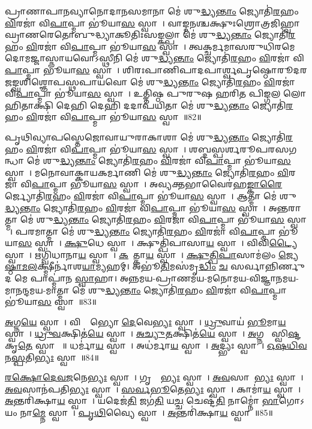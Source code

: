 𑌪𑍍𑌰𑌾𑌣𑌾𑌪𑌾𑌨𑌵𑍍𑌯𑌾𑌨𑍋𑌦𑌾𑌨𑌸𑌮𑌾𑌨𑌾 𑌮𑍇॑ 𑌶𑍁\ul{𑌦𑍍𑌧𑍍𑌯}\ul{𑌨𑍍𑌤𑌾𑌂} 𑌜𑍍𑌯𑍋𑌤𑌿॑\ul{𑌰}𑌹𑌂 \ul{𑌵𑌿}𑌰𑌜𑌾॑ 𑌵𑌿\ul{𑌪𑌾}𑌪𑍍𑌮𑌾 𑌭𑍂॑𑌯𑌾\ul{𑌸}\ul{} 𑌸𑍍𑌵𑌾𑌹𑌾᳚।
𑌵𑌾𑌙𑍍𑌮𑌨𑌶𑍍𑌚𑌕𑍍𑌷𑍁𑌃𑌶𑍍𑌰𑍋𑌤𑍍𑌰𑌜𑌿𑌹𑍍𑌵𑌾𑌘𑍍𑌰𑌾𑌣𑌰𑍇𑌤𑍋\-𑌬𑍁𑌦𑍍𑌧𑍍𑌯𑌾𑌕𑍂𑌤𑌿𑌃\-𑌸𑌙𑍍𑌕𑌲𑍍𑌪𑌾 𑌮𑍇॑ 𑌶𑍁\ul{𑌦𑍍𑌧𑍍𑌯}\ul{𑌨𑍍𑌤𑌾𑌂} 𑌜𑍍𑌯𑍋𑌤𑌿॑\ul{𑌰}𑌹𑌂 \ul{𑌵𑌿}𑌰𑌜𑌾॑ 𑌵𑌿\ul{𑌪𑌾}𑌪𑍍𑌮𑌾 𑌭𑍂॑𑌯𑌾\ul{𑌸}\ul{} 𑌸𑍍𑌵𑌾𑌹𑌾᳚। 
𑌤𑍍𑌵𑌕𑍍𑌚𑌰𑍍𑌮𑌮𑌾𑌸𑌰𑍁𑌧𑌿𑌰𑌮𑍇𑌦𑍋𑌮𑌜𑍍𑌜𑌾𑌸𑍍𑌨𑌾𑌯𑌵𑍋\-𑌽𑌸𑍍𑌥𑍀𑌨𑌿  𑌮𑍇॑ 𑌶𑍁\ul{𑌦𑍍𑌧𑍍𑌯}\ul{𑌨𑍍𑌤𑌾𑌂} 𑌜𑍍𑌯𑍋𑌤𑌿॑\ul{𑌰}𑌹𑌂 \ul{𑌵𑌿}𑌰𑌜𑌾॑ 𑌵𑌿\ul{𑌪𑌾}𑌪𑍍𑌮𑌾 𑌭𑍂॑𑌯𑌾\ul{𑌸}\ul{} 𑌸𑍍𑌵𑌾𑌹𑌾᳚। 
𑌶𑌿𑌰𑌃𑌪𑌾𑌣𑌿𑌪𑌾𑌦𑌪𑌾𑌰𑍍𑌶𑍍𑌵𑌪𑍃𑌷𑍍𑌠𑍋𑌰𑍂𑌦𑌰𑌜𑌙𑍍𑌘𑌶𑌿𑌶𑍍𑌞𑍋𑌪𑌸𑍍𑌥𑌪𑌾𑌯𑌵𑍋  𑌮𑍇॑ 𑌶𑍁\ul{𑌦𑍍𑌧𑍍𑌯}\ul{𑌨𑍍𑌤𑌾𑌂} 𑌜𑍍𑌯𑍋𑌤𑌿॑\ul{𑌰}𑌹𑌂 \ul{𑌵𑌿}𑌰𑌜𑌾॑ 𑌵𑌿\ul{𑌪𑌾}𑌪𑍍𑌮𑌾 𑌭𑍂॑𑌯𑌾\ul{𑌸}\ul{} 𑌸𑍍𑌵𑌾𑌹𑌾᳚।
𑌉𑌤𑍍𑌤𑌿𑌷𑍍𑌠 𑌪𑍁𑌰𑍁𑌷 𑌹𑌰𑌿𑌤 𑌪𑌿𑌙𑍍𑌗𑌲 𑌲𑍋𑌹𑌿𑌤𑌾𑌕𑍍𑌷𑌿 𑌦𑍇𑌹𑌿 𑌦𑍇𑌹𑌿 𑌦𑌦𑌾𑌪𑌯𑌿𑌤𑌾 𑌮𑍇॑ 𑌶𑍁\ul{𑌦𑍍𑌧𑍍𑌯}\ul{𑌨𑍍𑌤𑌾𑌂} 𑌜𑍍𑌯𑍋𑌤𑌿॑\ul{𑌰}𑌹𑌂 \ul{𑌵𑌿}𑌰𑌜𑌾॑ 𑌵𑌿\ul{𑌪𑌾}𑌪𑍍𑌮𑌾 𑌭𑍂॑𑌯𑌾\ul{𑌸}\ul{} 𑌸𑍍𑌵𑌾𑌹𑌾᳚॥82॥ 
\anuvakamend

𑌪𑍃𑌥𑌿𑌵𑍍𑌯𑌾𑌪𑌸𑍍𑌤𑍇𑌜𑍋𑌵𑌾𑌯𑍁𑌰𑌾𑌕𑌾𑌶𑌾 𑌮𑍇॑ 𑌶𑍁\ul{𑌦𑍍𑌧𑍍𑌯}\ul{𑌨𑍍𑌤𑌾𑌂} 𑌜𑍍𑌯𑍋𑌤𑌿॑\ul{𑌰}𑌹𑌂 \ul{𑌵𑌿}𑌰𑌜𑌾॑ 𑌵𑌿\ul{𑌪𑌾}𑌪𑍍𑌮𑌾 𑌭𑍂॑𑌯𑌾\ul{𑌸}\ul{} 𑌸𑍍𑌵𑌾𑌹𑌾᳚। 
𑌶𑌬𑍍𑌦𑌸𑍍𑌪𑌰𑍍𑌶𑌰𑍂𑌪𑌰𑌸𑌗𑌨𑍍𑌧𑌾  𑌮𑍇॑ 𑌶𑍁\ul{𑌦𑍍𑌧𑍍𑌯}\ul{𑌨𑍍𑌤𑌾𑌂} 𑌜𑍍𑌯𑍋𑌤𑌿॑\ul{𑌰}𑌹𑌂 \ul{𑌵𑌿}𑌰𑌜𑌾॑ 𑌵𑌿\ul{𑌪𑌾}𑌪𑍍𑌮𑌾 𑌭𑍂॑𑌯𑌾\ul{𑌸}\ul{} 𑌸𑍍𑌵𑌾𑌹𑌾᳚। 
𑌮𑌨𑍋𑌵𑌾𑌕𑍍𑌕𑌾𑌯𑌕𑌰𑍍𑌮𑌾𑌣𑌿  𑌮𑍇॑ 𑌶𑍁\ul{𑌦𑍍𑌧𑍍𑌯}\ul{𑌨𑍍𑌤𑌾𑌂} 𑌜𑍍𑌯𑍋𑌤𑌿॑\ul{𑌰}𑌹𑌂 \ul{𑌵𑌿}𑌰𑌜𑌾॑ 𑌵𑌿\ul{𑌪𑌾}𑌪𑍍𑌮𑌾 𑌭𑍂॑𑌯𑌾\ul{𑌸}\ul{} 𑌸𑍍𑌵𑌾𑌹𑌾᳚। 
𑌅𑌵𑍍𑌯𑌕𑍍𑌤𑌭𑌾𑌵𑍈𑌰॑𑌹\ul{𑌙𑍍𑌕𑌾}\ul{𑌰𑍈}𑌰𑍍𑌜𑍍𑌯𑍋𑌤𑌿॑\ul{𑌰}𑌹𑌂 \ul{𑌵𑌿}𑌰𑌜𑌾॑ 𑌵𑌿\ul{𑌪𑌾}𑌪𑍍𑌮𑌾 𑌭𑍂॑𑌯𑌾\ul{𑌸}\ul{} 𑌸𑍍𑌵𑌾𑌹𑌾᳚। 
𑌆𑌤𑍍𑌮𑌾 𑌮𑍇॑ 𑌶𑍁\ul{𑌦𑍍𑌧𑍍𑌯}\ul{𑌨𑍍𑌤𑌾𑌂} 𑌜𑍍𑌯𑍋𑌤𑌿॑\ul{𑌰}𑌹𑌂 \ul{𑌵𑌿}𑌰𑌜𑌾॑ 𑌵𑌿\ul{𑌪𑌾}𑌪𑍍𑌮𑌾 𑌭𑍂॑𑌯𑌾\ul{𑌸}\ul{} 𑌸𑍍𑌵𑌾𑌹𑌾᳚। 
𑌅𑌨𑍍𑌤𑌰𑌾𑌤𑍍𑌮𑌾 𑌮𑍇॑ 𑌶𑍁\ul{𑌦𑍍𑌧𑍍𑌯}\ul{𑌨𑍍𑌤𑌾𑌂} 𑌜𑍍𑌯𑍋𑌤𑌿॑\ul{𑌰}𑌹𑌂 \ul{𑌵𑌿}𑌰𑌜𑌾॑ 𑌵𑌿\ul{𑌪𑌾}𑌪𑍍𑌮𑌾 𑌭𑍂॑𑌯𑌾\ul{𑌸}\ul{} 𑌸𑍍𑌵𑌾𑌹𑌾᳚। 
𑌪𑌰𑌮𑌾𑌤𑍍𑌮𑌾  𑌮𑍇॑ 𑌶𑍁\ul{𑌦𑍍𑌧𑍍𑌯}\ul{𑌨𑍍𑌤𑌾𑌂} 𑌜𑍍𑌯𑍋𑌤𑌿॑\ul{𑌰}𑌹𑌂 \ul{𑌵𑌿}𑌰𑌜𑌾॑ 𑌵𑌿\ul{𑌪𑌾}𑌪𑍍𑌮𑌾 𑌭𑍂॑𑌯𑌾\ul{𑌸}\ul{} 𑌸𑍍𑌵𑌾𑌹𑌾᳚। 
\ul{𑌕𑍍𑌷𑍁}𑌧𑍇 𑌸𑍍𑌵𑌾𑌹𑌾᳚। 
𑌕𑍍𑌷𑍁𑌤𑍍𑌪𑌿॑𑌪𑌾𑌸𑌾\ul{𑌯} 𑌸𑍍𑌵𑌾𑌹𑌾᳚। 
𑌵𑌿𑌵𑌿॑\ul{𑌟𑍍𑌯𑍈} 𑌸𑍍𑌵𑌾𑌹𑌾᳚। 
𑌋𑌗𑍍𑌵𑌿॑𑌧𑌾𑌨𑌾\ul{𑌯} 𑌸𑍍𑌵𑌾𑌹𑌾᳚। 
\ul{𑌕}𑌷𑍋᳚𑌤𑍍𑌕𑌾\ul{𑌯} 𑌸𑍍𑌵𑌾𑌹𑌾᳚। 
\ul{𑌕𑍍𑌷𑍁}\ul{𑌤𑍍𑌪𑌿}\ul{𑌪𑌾}𑌸𑌾𑌮॑𑌲𑌂 \ul{𑌜𑍍𑌯𑍇}\ul{𑌷𑍍𑌠𑌾}\ul{𑌮}\ul{𑌲}𑌕𑍍𑌷𑍍𑌮𑍀𑌰𑍍𑌨𑌾॑𑌶\ul{𑌯𑌾}𑌮𑍍𑌯𑌹𑌮𑍍। 
𑌅𑌭𑍂॑\ul{𑌤𑌿}𑌮𑌸॑𑌮𑍃\ul{𑌦𑍍𑌧𑌿𑌂} \ul{𑌚} 𑌸𑌰𑍍𑌵𑌾𑌨𑍍𑌨𑌿𑌰𑍍𑌣𑍁𑌦 𑌮𑍇 𑌪𑌾𑌪𑍍𑌮𑌾॑𑌨 \ul{𑌸𑍍𑌵𑌾}𑌹𑌾।
𑌅𑌨𑍍𑌨𑌮𑌯-𑌪𑍍𑌰𑌾𑌣𑌮𑌯-𑌮𑌨𑍋𑌮𑌯-𑌵𑌿𑌜𑍍𑌞𑌾𑌨𑌮𑌯-𑌮𑌾𑌨𑌨𑍍𑌦𑌮𑌯-𑌮𑌾𑌤𑍍𑌮𑌾 𑌮𑍇॑ 𑌶𑍁\ul{𑌦𑍍𑌧𑍍𑌯}\ul{𑌨𑍍𑌤𑌾𑌂} 𑌜𑍍𑌯𑍋𑌤𑌿॑\ul{𑌰}𑌹𑌂 \ul{𑌵𑌿}𑌰𑌜𑌾॑ 𑌵𑌿\ul{𑌪𑌾}𑌪𑍍𑌮𑌾 𑌭𑍂॑𑌯𑌾\ul{𑌸}\ul{} 𑌸𑍍𑌵𑌾𑌹𑌾᳚॥83॥
\anuvakamend

\ul{𑌅}𑌗𑍍𑌨\ul{𑌯𑍇} 𑌸𑍍𑌵𑌾𑌹𑌾᳚। 
𑌵𑌿𑌶𑍍𑌵𑍇᳚𑌭𑍍𑌯𑍋 \ul{𑌦𑍇}𑌵𑍇\ul{𑌭𑍍𑌯𑌃} 𑌸𑍍𑌵𑌾𑌹𑌾᳚। 
\ul{𑌧𑍍𑌰𑍁}𑌵𑌾𑌯॑ \ul{𑌭𑍂}𑌮𑌾\ul{𑌯} 𑌸𑍍𑌵𑌾𑌹𑌾᳚। 
\ul{𑌧𑍍𑌰𑍁}\ul{𑌵}𑌕𑍍𑌷𑌿𑌤॑\ul{𑌯𑍇} 𑌸𑍍𑌵𑌾𑌹𑌾᳚। 
\ul{𑌅}\ul{𑌚𑍍𑌯𑍁}\ul{𑌤}𑌕𑍍𑌷𑌿𑌤॑\ul{𑌯𑍇} 𑌸𑍍𑌵𑌾𑌹𑌾᳚। 
\ul{𑌅}𑌗𑍍𑌨𑌯𑍇᳚ 𑌸𑍍𑌵𑌿\ul{𑌷𑍍𑌟}𑌕𑍃\ul{𑌤𑍇} 𑌸𑍍𑌵𑌾𑌹𑌾᳚ ॥ 
𑌧𑌰𑍍𑌮𑌾॑\ul{𑌯} 𑌸𑍍𑌵𑌾𑌹𑌾᳚। 
𑌅𑌧॑𑌰𑍍𑌮𑌾\ul{𑌯} 𑌸𑍍𑌵𑌾𑌹𑌾᳚। 
\ul{𑌅}𑌦𑍍𑌭𑍍𑌯𑌃 𑌸𑍍𑌵𑌾𑌹𑌾᳚। 
\ul{𑌓}\ul{𑌷}\ul{𑌧𑌿}\ul{𑌵}\ul{𑌨}\ul{𑌸𑍍𑌪}𑌤𑌿\ul{𑌭𑍍𑌯𑌃} 𑌸𑍍𑌵𑌾𑌹𑌾᳚॥84॥ 


\ul{𑌰}\ul{𑌕𑍍𑌷𑍋}\ul{𑌦𑍇}\ul{𑌵}\ul{𑌜}𑌨𑍇\ul{𑌭𑍍𑌯𑌃} 𑌸𑍍𑌵𑌾𑌹𑌾᳚। 
𑌗𑍃𑌹𑍍𑌯𑌾᳚\ul{𑌭𑍍𑌯𑌃} 𑌸𑍍𑌵𑌾𑌹𑌾᳚। 
\ul{𑌅}\ul{𑌵}𑌸𑌾𑌨𑍇᳚\ul{𑌭𑍍𑌯𑌃} 𑌸𑍍𑌵𑌾𑌹𑌾᳚। 
\ul{𑌅}\ul{𑌵}𑌸𑌾𑌨॑𑌪𑌤𑌿\ul{𑌭𑍍𑌯𑌃} 𑌸𑍍𑌵𑌾𑌹𑌾᳚। 
\ul{𑌸}\ul{𑌰𑍍𑌵}\ul{𑌭𑍂}𑌤𑍇\ul{𑌭𑍍𑌯𑌃} 𑌸𑍍𑌵𑌾𑌹𑌾᳚। 
𑌕𑌾𑌮𑌾॑\ul{𑌯} 𑌸𑍍𑌵𑌾𑌹𑌾᳚। 
\ul{𑌅}𑌨𑍍𑌤𑌰𑌿॑𑌕𑍍𑌷𑌾\ul{𑌯} 𑌸𑍍𑌵𑌾𑌹𑌾᳚। 
𑌯𑌦𑍇𑌜॑\ul{𑌤𑌿} 𑌜𑌗॑\ul{𑌤𑌿} 𑌯\ul{𑌚𑍍𑌚} 𑌚𑍇𑌷𑍍𑌟॑\ul{𑌤𑌿} 𑌨𑌾𑌮𑍍𑌨𑍋॑ \ul{𑌭𑌾}𑌗𑍋𑌽𑌯𑌂 𑌨𑌾\ul{𑌮𑍍𑌨𑍇} 𑌸𑍍𑌵𑌾𑌹𑌾᳚। 
\ul{𑌪𑍃}\ul{𑌥𑌿}𑌵𑍍𑌯𑍈 𑌸𑍍𑌵𑌾𑌹𑌾᳚। 
\ul{𑌅}𑌨𑍍𑌤𑌰𑌿॑𑌕𑍍𑌷𑌾\ul{𑌯} 𑌸𑍍𑌵𑌾𑌹𑌾᳚॥85॥ 


